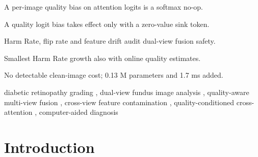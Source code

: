\documentclass[final,5p,times,twocolumn,authoryear]{elsarticle}
\theoremstyle{plain}
\theoremstyle{remark}
\begin{document}
\begin{frontmatter}

\begin{highlights}
\item A per-image quality bias on attention logits is a softmax no-op.
\item A quality logit bias takes effect only with a zero-value sink token.
\item Harm Rate, flip rate and feature drift audit dual-view fusion safety.
\item Smallest Harm Rate growth also with online quality estimates.
\item No detectable clean-image cost; 0.13 M parameters and 1.7 ms added.
\end{highlights}

\begin{keyword}
diabetic retinopathy grading \sep
dual-view fundus image analysis \sep
quality-aware multi-view fusion \sep
cross-view feature contamination \sep
quality-conditioned cross-attention \sep
computer-aided diagnosis
\end{keyword}

\end{frontmatter}

\section{Introduction}
\label{sec:intro}
\end{document}
